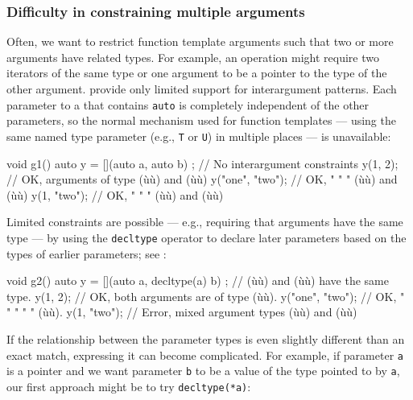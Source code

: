 {\subsubsection[Difficulty in constraining multiple arguments]{Difficulty in constraining multiple arguments}\label{difficulty-in-constraining-multiple-arguments}

Often, we want to restrict function template arguments such that two or
more arguments have related types. For example, an operation might
require two iterators of the same type or one argument to be a pointer
to the type of the other argument.  provide only
limited support for interargument patterns. Each parameter to a
 that contains \lstinline!auto! is completely
independent of the other parameters, so the normal mechanism used for
function templates --- using the same named type parameter (e.g.,
\lstinline!T! or \lstinline!U!) in multiple places --- is unavailable:

\begin{emcppslisting}[emcppsstandards={c++14}]
void g1()
{
    auto y = [](auto a, auto b) { };  // No interargument constraints
    y(1, 2);          // OK, arguments of type (ù{}ù) and (ù{}ù)
    y("one", "two");  // OK,     "      "   "  (ù{}ù) and (ù{}ù)
    y(1, "two");      // OK,     "      "   "  (ù{}ù) and (ù{}ù)
}
\end{emcppslisting}
    

\noindent Limited constraints are possible --- e.g., requiring that arguments have
the same type --- by using the \lstinline!decltype! operator to declare
later parameters based on the types of earlier parameters; see
:

\begin{emcppslisting}[emcppsstandards={c++14}]
void g2()
{
    auto y = [](auto a, decltype(a) b) { };  // (ù{}ù) and (ù{}ù) have the same type.
    y(1, 2);          // OK, both arguments are of type (ù{}ù).
    y("one", "two");  // OK,   "      "      "   "   "  (ù{}ù).
    y(1, "two");      // Error, mixed argument types (ù{}ù) and (ù{}ù)
}
\end{emcppslisting}
    

\noindent If the relationship between the parameter types is even slightly
different than an exact match, expressing it can become complicated. For
example, if parameter \lstinline!a! is a pointer and we want parameter
\lstinline!b! to be a value of the type pointed to by \lstinline!a!, our first
approach might be to try \lstinline!decltype(*a)!:

}

